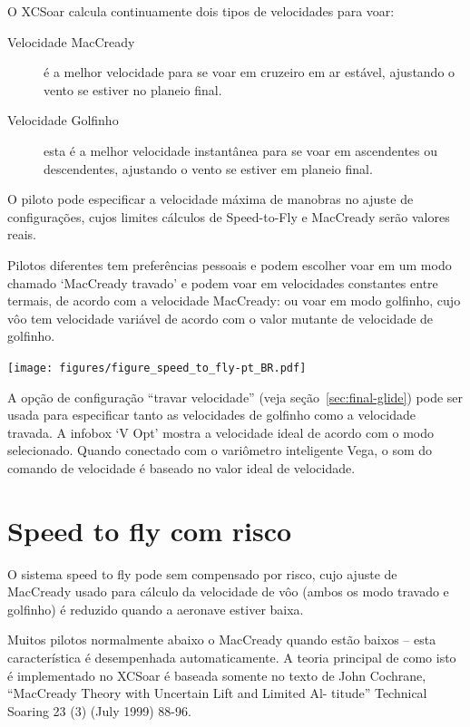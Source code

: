 O XCSoar calcula continuamente dois tipos de velocidades para voar:
\begin{description}
\item[Velocidade MacCready]  é a melhor velocidade para se voar em cruzeiro em ar estável, ajustando o vento se estiver no planeio final.
\item[Velocidade Golfinho]  esta é a melhor velocidade instantânea para se voar em ascendentes ou descendentes, ajustando o vento se estiver em planeio final.
\end{description}  

O piloto pode especificar a velocidade máxima de manobras no ajuste de configurações, cujos limites cálculos de Speed-to-Fly e MacCready serão valores reais.

Pilotos diferentes tem preferências pessoais e podem escolher voar em um modo chamado ‘MacCready travado’ e podem voar em velocidades constantes entre termais, de acordo com a velocidade MacCready: ou voar em modo golfinho, cujo vôo tem velocidade variável de acordo com o valor mutante de velocidade de golfinho. 

\begin{maxipage}
\begin{center}
\texttt{[image: figures/figure\_speed\_to\_fly-pt\_BR.pdf]}
\end{center}
\end{maxipage}

A opção de configuração “travar velocidade” (veja seção~\ref{sec:final-glide}) pode ser usada para especificar tanto as velocidades de golfinho como a velocidade travada.  A infobox ‘V Opt’ mostra a velocidade ideal de acordo com o modo selecionado. Quando conectado com o variômetro inteligente Vega, o som do comando de velocidade é baseado no valor ideal de velocidade.


\section{Speed to fly com risco}\label{sec:safety-factor}

 O sistema speed to fly pode sem compensado por risco, cujo ajuste de MacCready usado para cálculo da velocidade de vôo (ambos os modo travado e golfinho) é reduzido quando a aeronave estiver baixa.

Muitos pilotos normalmente abaixo o MacCready quando estão baixos – esta característica é desempenhada automaticamente.  A teoria principal de como isto é implementado no XCSoar é baseada somente no texto de John Cochrane, “MacCready Theory with Uncertain Lift and Limited Al- titude” Technical Soaring 23 (3) (July 1999) 88-96.

